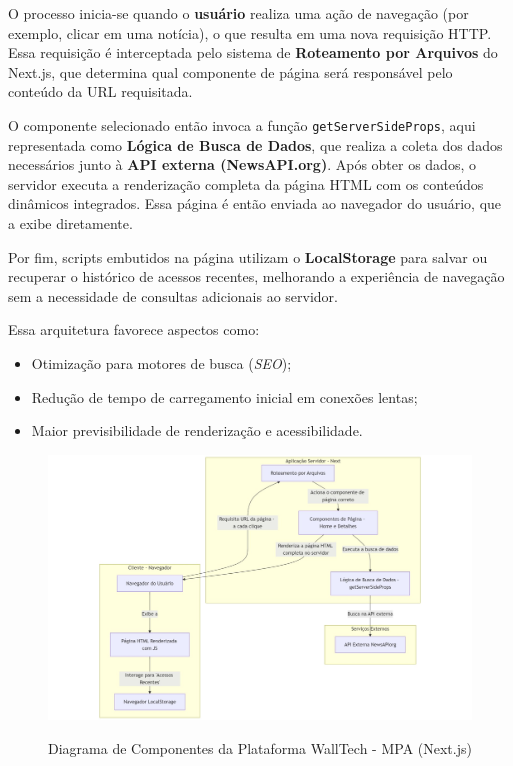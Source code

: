 O processo inicia-se quando o \textbf{usuário} realiza uma ação de navegação (por exemplo, clicar em uma notícia), o que resulta em uma nova requisição HTTP. Essa requisição é interceptada pelo sistema de \textbf{Roteamento por Arquivos} do Next.js, que determina qual componente de página será responsável pelo conteúdo da URL requisitada.

O componente selecionado então invoca a função \texttt{getServerSideProps}, aqui representada como \textbf{Lógica de Busca de Dados}, que realiza a coleta dos dados necessários junto à \textbf{API externa (NewsAPI.org)}. Após obter os dados, o servidor executa a renderização completa da página HTML com os conteúdos dinâmicos integrados. Essa página é então enviada ao navegador do usuário, que a exibe diretamente.

Por fim, scripts embutidos na página utilizam o \textbf{LocalStorage} para salvar ou recuperar o histórico de acessos recentes, melhorando a experiência de navegação sem a necessidade de consultas adicionais ao servidor.

Essa arquitetura favorece aspectos como:
\begin{itemize}
  \item Otimização para motores de busca (\textit{SEO});
  \item Redução de tempo de carregamento inicial em conexões lentas;
  \item Maior previsibilidade de renderização e acessibilidade.
\end{itemize}


\begin{figure}[H]
  \centering
  \caption{Diagrama de Componentes da Plataforma WallTech - MPA (Next.js)}
  \includegraphics[width=1\textwidth]{media/component-diagram-next.jpeg}
  \label{fig:component-diagram-next}
\end{figure}




